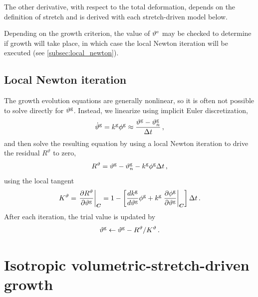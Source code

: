 \documentclass[10pt,letterpaper,oneside]{report}
\newcommand{\scas}[1]{\mbox{{\scriptsize{${\rm{#1}}$}}}{}}
\newcommand{\tens}[1]{\mbox{\boldmath{\scriptsize{$#1$}}}{}}
\begin{document}
The other derivative, with respect to the total deformation, depends on the definition of stretch and is derived with each stretch-driven model below.

Depending on the growth criterion, the value of $\vartheta^{\scas{e}}$ may be checked to determine if growth will take place, in which case the local Newton iteration will be executed (see \autoref{subsec:local_newton}).



\subsection{Local Newton iteration}
\label{subsec:local_newton}
The growth evolution equations are generally nonlinear, so it is often not possible to solve directly for $\vartheta^{\scas{g}}$.  Instead, we linearize using implicit Euler discretization, 
\begin{equation}
\dot{\vartheta}^{\scas{g}} = k^{\scas{g}} \phi^{\scas{g}} \approx{} \frac{\vartheta^{\scas{g}} - \vartheta^{\scas{g}}_n }{\Delta t} \, , 
\end{equation}
and then solve the resulting equation by using a local Newton iteration to drive the residual $R^\vartheta$ to zero, 
\begin{equation}
R^\vartheta = \vartheta^{\scas{g}} - \vartheta^{\scas{g}}_n - k^{\scas{g}} \phi^{\scas{g}} \Delta t \, , 
\end{equation}
using the local tangent 
\begin{equation}
K^\vartheta = \left. \frac{\partial R^\vartheta}{\partial \vartheta^{\scas{g}} } \right|_{\tens{C}} = 1 - \left[ \frac{d k^{\scas{g}}}{d \vartheta^{\scas{g}} } \phi^{\scas{g}} + k^{\scas{g}} \left. \frac{\partial \phi^{\scas{g}} }{\partial \vartheta^{\scas{g}} } \right|_{\tens{C}} \right] \Delta t \, . 
\end{equation}
After each iteration, the trial value is updated by
\begin{equation}
\vartheta^{\scas{g}} \leftarrow \vartheta^{\scas{g}} - R^\vartheta / K^\vartheta \, .  
\end{equation}



\section{Isotropic volumetric-stretch-driven growth}
\end{document}
